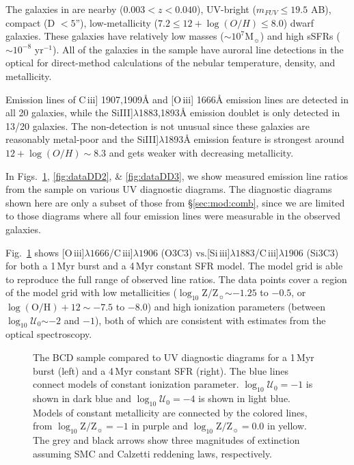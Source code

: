 \documentclass[preprint2]{aastex61}
\newcommand{\oiii}{[O\,{\sc iii}]\xspace}
\newcommand{\SiuIII}{[Si\,{\sc iii}]\xspace}
\newcommand{\ciii}{C\,{\sc iii}]\xspace}
\newcommand\vs{\ensuremath{\mathrm{vs.}}\xspace}
\newcommand\Msun{\ensuremath{\mathrm{M_{\sun}}}\xspace}
\newcommand{\Myr}{$\,$Myr\xspace}
\newcommand{\logten}{\ensuremath{\log_{10}}}
\newcommand{\logz}{\ensuremath{\logten \mathrm{Z}/\mathrm{Z}_{\sun}}\xspace}
\newcommand{\logZeq}[1]{\ensuremath{\logten \mathrm{Z}/\mathrm{Z}_{\sun} = #1}}
\newcommand{\ang}{\ensuremath{\mbox{\AA}}\xspace}
\newcommand{\logU}{\ensuremath{\logten \mathcal{U}_0}}
\newcommand{\logUeq}[1]{\ensuremath{\logten \mathcal{U}_0 = #1}}
\begin{document}
The galaxies in \citet{Berg+2016} are nearby ($0.003 < z < 0.040$), UV-bright ($m_{FUV} \leq 19.5$ AB), compact (D $< 5$''), low-metallicity ($7.2 \leq 12 + \log(O/H) \leq 8.0$) dwarf galaxies. These galaxies have relatively low masses (${\sim}10^7$\Msun) and high sSFRs (${\sim}10^{-8}$ yr$^{-1}$). All of the galaxies in the sample have auroral line detections in the optical for direct-method calculations of the nebular temperature, density, and metallicity.

Emission lines of \ciii 1907,1909\ang and \oiii 1666\ang emission lines are detected in all 20 galaxies, while the Si\textsc{III}]$\lambda$1883,1893\ang emission doublet is only detected in 13/20 galaxies. The non-detection is not unusual since these galaxies are reasonably metal-poor and the Si\textsc{III}]$\lambda$1893\ang emission feature is strongest around $12 + \log(O/H){\sim}8.3$ and gets weaker with decreasing metallicity. 

In Figs.~\ref{fig:dataDD1}, \ref{fig:dataDD2}, \& \ref{fig:dataDD3}, we show measured emission line ratios from the \citet{Berg+2016} sample on various UV diagnostic diagrams. The diagnostic diagrams shown here are only a subset of those from \S\ref{sec:mod:comb}, since we are limited to those diagrams where all four emission lines were measurable in the observed galaxies.

Fig.~\ref{fig:dataDD1} shows \oiii$\lambda1666$/\ciii$\lambda1906$ (O3C3) \vs \SiuIII$\lambda1883$/\ciii$\lambda1906$ (Si3C3) for both a 1\Myr burst and a 4\Myr constant SFR model. The model grid is able to reproduce the full range of observed line ratios. The data points cover a region of the model grid with low metallicities (\logz${\sim}-1.25$ to $-0.5$, or $\log( \mathrm{O} / \mathrm{H} ) + 12{\sim}-7.5$ to $-8.0$) and high ionization parameters (between \logU${\sim}-2$ and $-1$), both of which are consistent with estimates from the optical spectroscopy.

\begin{figure}
  \begin{center}
    \caption{The \citet{Berg+2016} BCD sample compared to UV diagnostic diagrams for a 1\Myr burst (left) and a 4\Myr constant SFR (right). The blue lines connect models of constant ionization parameter. \logUeq{-1} is shown in dark blue and \logUeq{-4} is shown in light blue. Models of constant metallicity are connected by the colored lines, from \logZeq{-1} in purple and \logZeq{0.0} in yellow. The grey and black arrows show three magnitudes of extinction assuming SMC and Calzetti reddening laws, respectively.}
    \label{fig:dataDD1}
  \end{center}
\end{figure}
\end{document}
